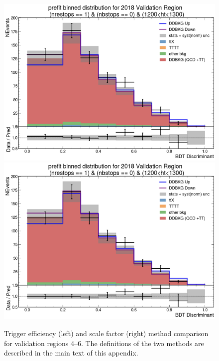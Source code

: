 \documentclass[twoside]{article}
\begin{document}
\begin{figure}[!t]
    \includegraphics[width=.45\columnwidth]{plots/Trigger/TriggerReview/eff6.png}
    \includegraphics[width=.45\columnwidth]{plots/Trigger/TriggerReview/SF6.png}

    \caption{
        Trigger efficiency (left) and scale factor (right) method comparison for validation regions 4–6.  
        The definitions of the two methods are described in the main text of this appendix.
    }
\end{figure}
\end{document}
